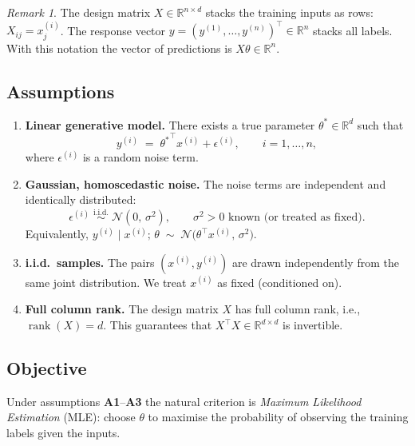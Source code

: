 \documentclass[11pt]{article}
\theoremstyle{definition}
\theoremstyle{remark}
\newtheorem{remark}[theorem]{Remark}
\newcommand{\R}{\mathbb{R}}
\newcommand{\T}{^{\top}}
\begin{document}
\begin{remark}
    The design matrix $X \in \R^{n \times d}$ stacks the training inputs as
    rows: $X_{ij} = x^{(i)}_{j}$.  The response vector $y = (y^{(1)},\ldots,y^{(n)})\T
    \in \R^{n}$ stacks all labels.  With this notation the vector of predictions
    is $X\theta \in \R^{n}$.
\end{remark}

\subsection{Assumptions}

\begin{enumerate}[label=\textbf{A\arabic*.}]
    \item \textbf{Linear generative model.}
          There exists a true parameter $\theta^{*} \in \R^{d}$ such that
          \[
              y^{(i)} \;=\; {\theta^{*}}\T x^{(i)} + \epsilon^{(i)},
              \qquad i = 1,\ldots,n,
          \]
          where $\epsilon^{(i)}$ is a random noise term.

    \item \textbf{Gaussian, homoscedastic noise.}
          The noise terms are independent and identically distributed:
          \[
              \epsilon^{(i)} \;\overset{\text{i.i.d.}}{\sim}\; \mathcal{N}(0,\, \sigma^{2}),
              \qquad \sigma^{2} > 0 \text{ known (or treated as fixed)}.
          \]
          Equivalently, $y^{(i)} \mid x^{(i)};\,\theta \;\sim\; \mathcal{N}\!\bigl(\theta\T x^{(i)},\,\sigma^{2}\bigr)$.

    \item \textbf{i.i.d.\ samples.}
          The pairs $(x^{(i)}, y^{(i)})$ are drawn independently from the same
          joint distribution.  We treat $x^{(i)}$ as fixed (conditioned on).

    \item \textbf{Full column rank.}
          The design matrix $X$ has full column rank, i.e.,
          $\operatorname{rank}(X) = d$.
          This guarantees that $X\T X \in \R^{d \times d}$ is invertible.
\end{enumerate}

\subsection{Objective}

Under assumptions \textbf{A1}--\textbf{A3} the natural criterion is
\emph{Maximum Likelihood Estimation} (MLE): choose $\theta$ to maximise the
probability of observing the training labels given the inputs.
\end{document}
